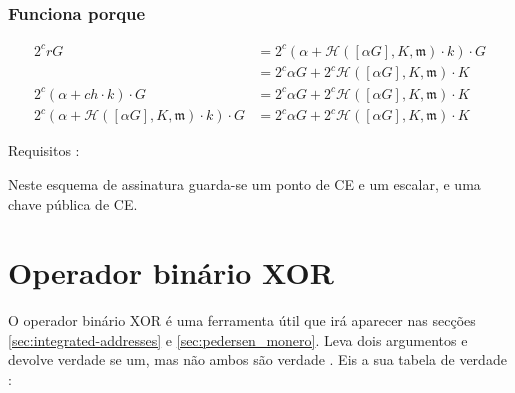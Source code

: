 \begin{enumerate}


\subsubsection*{Funciona porque}


\begin{align*}
2^c r G &= 2^c (\alpha + \mathcal{H}([\alpha G], K,  \mathfrak{m}) \cdot k) \cdot G\\
		&= 2^c \alpha G + 2^c \mathcal{H}([\alpha G], K,  \mathfrak{m}) \cdot K\\ 
2^c (\alpha + ch \cdot k) \cdot G &= 2^c \alpha G + 2^c \mathcal{H}([\alpha G], K,\mathfrak{m}) \cdot K\\
2^c (\alpha + \mathcal{H}([\alpha G], K, \mathfrak{m}) \cdot k) \cdot G &= 2^c \alpha G + 2^c \mathcal{H}([\alpha G], K,\mathfrak{m}) \cdot K
\end{align*}



Requisitos :

Neste esquema de assinatura guarda-se um ponto de CE e um escalar, e uma chave pública de CE.

\section{Operador binário XOR}
\label{sec:XOR_section}

O operador binário XOR é uma ferramenta útil que irá aparecer nas secções \ref{sec:integrated-addresses} e \ref{sec:pedersen_monero}.
Leva dois argumentos e devolve verdade se um, mas não ambos são verdade
\cite{wolfram-xor}. 
Eis a sua tabela de verdade :


\end{enumerate}
